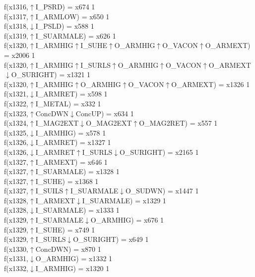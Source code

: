 f(x1316,$\uparrow$I\_PSRD) = x674 {1} \\
f(x1317,$\uparrow$I\_ARMLOW) = x650 {1} \\
f(x1318,$\downarrow$I\_PSLD) = x588 {1} \\
f(x1319,$\uparrow$I\_SUARMALE) = x626 {1} \\
f(x1320,$\uparrow$I\_ARMHIG$\uparrow$I\_SUHE$\uparrow$O\_ARMHIG$\uparrow$O\_VACON$\uparrow$O\_ARMEXT) = x2006 {1} \\
f(x1320,$\uparrow$I\_ARMHIG$\uparrow$I\_SURLS$\uparrow$O\_ARMHIG$\uparrow$O\_VACON$\uparrow$O\_ARMEXT$\downarrow$O\_SURIGHT) = x1321 {1} \\
f(x1320,$\uparrow$I\_ARMHIG$\uparrow$O\_ARMHIG$\uparrow$O\_VACON$\uparrow$O\_ARMEXT) = x1326 {1} \\
f(x1321,$\downarrow$I\_ARMRET) = x598 {1} \\
f(x1322,$\uparrow$I\_METAL) = x332 {1} \\
f(x1323,$\uparrow$ConcDWN$\downarrow$ConcUP) = x634 {1} \\
f(x1324,$\uparrow$I\_MAG2EXT$\downarrow$O\_MAG2EXT$\uparrow$O\_MAG2RET) = x557 {1} \\
f(x1325,$\downarrow$I\_ARMHIG) = x578 {1} \\
f(x1326,$\downarrow$I\_ARMRET) = x1327 {1} \\
f(x1326,$\downarrow$I\_ARMRET$\uparrow$I\_SURLS$\downarrow$O\_SURIGHT) = x2165 {1} \\
f(x1327,$\uparrow$I\_ARMEXT) = x646 {1} \\
f(x1327,$\uparrow$I\_SUARMALE) = x1328 {1} \\
f(x1327,$\uparrow$I\_SUHE) = x1368 {1} \\
f(x1327,$\uparrow$I\_SUILS$\uparrow$I\_SUARMALE$\downarrow$O\_SUDWN) = x1447 {1} \\
f(x1328,$\uparrow$I\_ARMEXT$\downarrow$I\_SUARMALE) = x1329 {1} \\
f(x1328,$\downarrow$I\_SUARMALE) = x1333 {1} \\
f(x1329,$\uparrow$I\_SUARMALE$\downarrow$O\_ARMHIG) = x676 {1} \\
f(x1329,$\uparrow$I\_SUHE) = x749 {1} \\
f(x1329,$\uparrow$I\_SURLS$\downarrow$O\_SURIGHT) = x649 {1} \\
f(x1330,$\uparrow$ConcDWN) = x870 {1} \\
f(x1331,$\downarrow$O\_ARMHIG) = x1332 {1} \\
f(x1332,$\downarrow$I\_ARMHIG) = x1320 {1} \\
